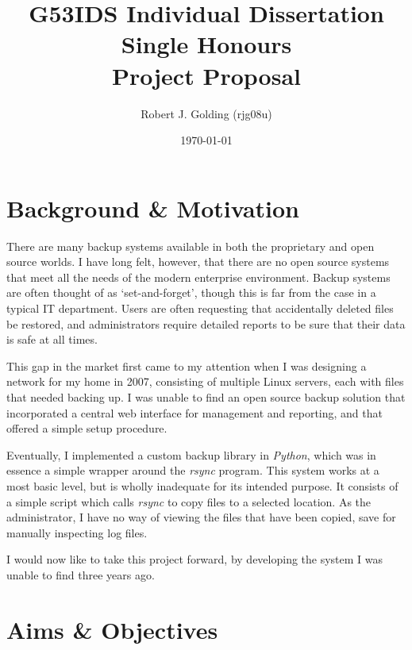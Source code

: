 \documentclass[a4paper]{article}
\title{
    \vspace{3cm}
    \huge{G53IDS Individual Dissertation Single Honours} \\[0.5cm]
    \LARGE{Project Proposal} \\[0.2cm]
}
\author{Robert J. Golding (rjg08u)} \date{\today}
\begin{document}
    \maketitle
    \vspace{10cm}
    \begin{figure}
        \centering
        \def\svgwidth{\columnwidth}
        
    \end{figure}
    \newpage

    \section{Background \& Motivation}

    There are many backup systems available in both the proprietary and open
    source worlds. I have long felt, however, that there are no open source
    systems that meet all the needs of the modern enterprise environment.
    Backup systems are often thought of as `set-and-forget', though this is far
    from the case in a typical IT department. Users are often requesting that
    accidentally deleted files be restored, and administrators require detailed
    reports to be sure that their data is safe at all times.

    This gap in the market first came to my attention when I was designing
    a network for my home in 2007, consisting of multiple Linux servers, each
    with files that needed backing up. I was unable to find an open source
    backup solution that incorporated a central web interface for management
    and reporting, and that offered a simple setup procedure.

    Eventually, I implemented a custom backup library in \emph{Python}, which
    was in essence a simple wrapper around the \emph{rsync} program. This
    system works at a most basic level, but is wholly inadequate for its
    intended purpose. It consists of a simple script which calls \emph{rsync}
    to copy files to a selected location. As the administrator, I have no way
    of viewing the files that have been copied, save for manually inspecting
    log files.

    I would now like to take this project forward, by developing the system
    I was unable to find three years ago.

    \section{Aims \& Objectives}
\end{document}
